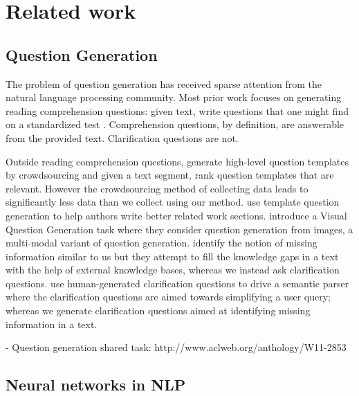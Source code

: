 \documentclass[11pt]{report}
\numberwithin{equation}{section}
\begin{document}

\newpage

\chapter{Related work}

\section{Question Generation}

The problem of question generation has received sparse attention from the natural language processing community. Most prior work focuses on generating reading comprehension questions:  given text, write questions that one might find on a standardized test \cite{vanderwende2008importance,heilman2011automatic,rus2011question,olney2012question}.  Comprehension questions, by definition, are answerable from the provided text. Clarification questions are not.  

Outside reading comprehension questions, \cite{labutov2015deep} generate high-level question templates by crowdsourcing and given a text segment, rank question templates that are relevant. However the crowdsourcing method of collecting data leads to significantly less data than we collect using our method. \cite{liu2010automatic} use template question generation to help authors write better related work sections. \cite{mostafazadeh2016generating} introduce a Visual Question Generation task where they consider question generation from images, a multi-modal variant of question generation. 
\cite{penas2010filling} identify the notion of missing information similar to us but they attempt to fill the knowledge gaps in a text with the help of external knowledge bases, whereas we instead ask clarification questions. \cite{artzi2011bootstrapping} use human-generated clarification questions to drive a semantic parser where the clarification questions are aimed towards simplifying a user query; whereas we generate clarification questions aimed at  identifying missing information in a text. 

- Question generation shared task: http://www.aclweb.org/anthology/W11-2853

\section{Neural networks in NLP}
\end{document}
